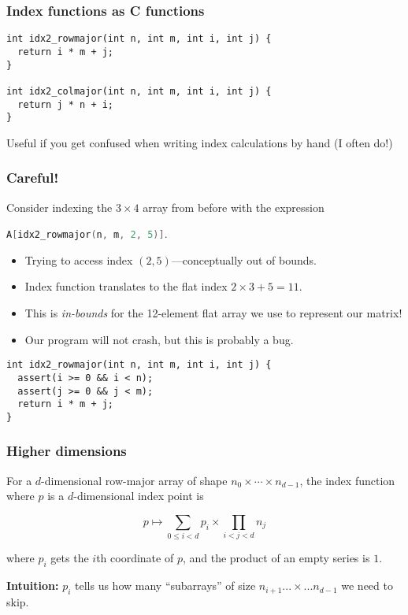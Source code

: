 \documentclass[rgb,dvipsnames,aspectratio=169,xcolor=table]{beamer}
\begin{document}
\begin{frame}[fragile]
  \frametitle{Index functions as C functions}

\begin{lstlisting}
int idx2_rowmajor(int n, int m, int i, int j) {
  return i * m + j;
}

int idx2_colmajor(int n, int m, int i, int j) {
  return j * n + i;
}
\end{lstlisting}

  \bigskip

  Useful if you get confused when writing index calculations by hand
  (I often do!)

\end{frame}

\begin{frame}[fragile]
  \frametitle{Careful!}

  Consider indexing the $3\times{}4$ array from before with the
  expression

\begin{center}
\lstinline[language=C]{A[idx2_rowmajor(n, m, 2, 5)]}.
\end{center}

\begin{itemize}
\item Trying to access index $(2,5)$---conceptually out of bounds.
\item Index function translates to the flat index $2\times{}3+5=11$.
\item This is \textit{in-bounds} for the 12-element flat array we use
  to represent our matrix!
\item Our program will not crash, but this is probably a bug.
\end{itemize}

\pause

\begin{lstlisting}
int idx2_rowmajor(int n, int m, int i, int j) {
  assert(i >= 0 && i < n);
  assert(j >= 0 && j < m);
  return i * m + j;
}
\end{lstlisting}

\end{frame}

\begin{frame}
  \frametitle{Higher dimensions}

  For a $d$-dimensional row-major array of shape
  $n_{0} \times{} \cdots \times{} n_{d-1}$, the index function where $p$
  is a $d$-dimensional index point is

\begin{equation*}
  p \mapsto \sum_{0 \leq i < d} p_{i}\times \prod_{i<j<d} n_{j}
\end{equation*}

where $p_{i}$ gets the $i$th coordinate of $p$, and the product of an
empty series is $1$.

\bigskip

\textbf{Intuition:} $p_{i}$ tells us how many ``subarrays'' of size
$n_{i+1}...\times...n_{d-1}$ we need to skip.

\end{frame}
\end{document}
